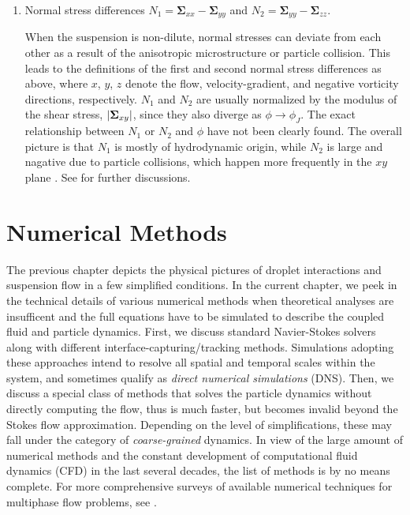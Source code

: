 \begin{enumerate}
\item Normal stress differences $N_1=\bm{\Sigma}_{xx}-\bm{\Sigma}_{yy}$ and $N_2=\bm{\Sigma}_{yy}-\bm{\Sigma}_{zz}$.

\medskip
When the suspension is non-dilute, normal stresses can deviate from each other as a result of the anisotropic microstructure or particle collision.
This leads to the definitions of the first and second normal stress differences as above, where $x$, $y$, $z$ denote the flow, velocity-gradient, and negative vorticity directions, respectively.
$N_1$ and $N_2$ are usually normalized by the modulus of the shear stress, $\lvert\bm{\Sigma}_{xy}\rvert$, since they also diverge as $\phi \to \phi_J$.
The exact relationship between $N_1$ or $N_2$ and $\phi$ have not been clearly found. The overall picture is that $N_1$ is mostly of hydrodynamic origin, while $N_2$ is large and nagative due to particle collisions, which happen more frequently in the $xy$ plane \citep{guazzelli_pouliquen_2018}.
See \cite{seto_giusteri_2018} for further discussions.

\end{enumerate}



\chapter{Numerical Methods}


The previous chapter depicts the physical pictures of droplet interactions and suspension flow in a few simplified conditions.
In the current chapter, we peek in the technical details of various numerical methods when theoretical analyses are insufficent and the full equations have to be simulated to describe the coupled fluid and particle dynamics.
First, we discuss standard Navier-Stokes solvers along with different interface-capturing/tracking methods. Simulations adopting these approaches intend to resolve all spatial and temporal scales within the system, and sometimes qualify as \emph{direct numerical simulations} (DNS).
Then, we discuss a special class of methods that solves the particle dynamics without directly computing the flow, thus is much faster, but becomes invalid beyond the Stokes flow approximation. Depending on the level of simplifications, these may fall under the category of \emph{coarse-grained} dynamics.
In view of the large amount of numerical methods and the constant development of computational fluid dynamics (CFD) in the last several decades, the list of methods is by no means complete. For more comprehensive surveys of available numerical techniques for multiphase flow problems, see \cite{prosperetti_tryggvason_2007, Rosti2019}.


